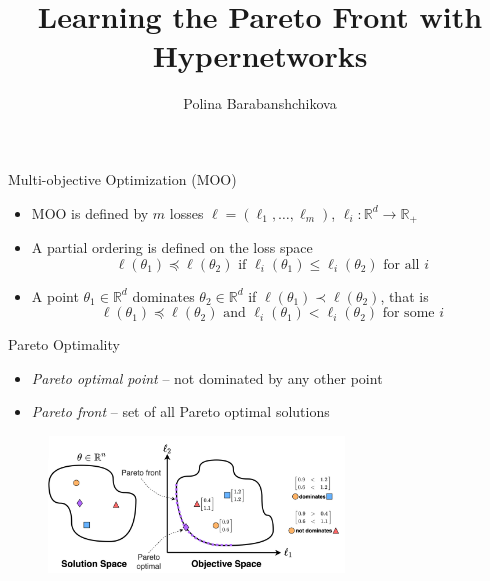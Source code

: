 \documentclass[13pt]{beamer}				\usepackage{graphicx}
\title[Learning the Pareto front with hypernetworks]{Learning the Pareto Front with Hypernetworks}
\author[Polina Barabanshchikova]{Polina Barabanshchikova}
\institute[MIPT]{MIPT}
\begin{document}
\begin{frame}
  \titlepage
\end{frame}

\begin{frame}{Multi-objective Optimization (MOO)}
\begin{itemize}
\item MOO is defined by $m$ losses $\boldsymbol\ell = (\ell_1, \dots, \ell_m)$, $\ell_i : \mathbb{R}^d \rightarrow \mathbb{R}_+$%
\item A partial ordering is defined on the loss space 
$$\boldsymbol\ell (\theta_1) \preceq \boldsymbol\ell (\theta_2) \text{ if } \ell_i(\theta_1) \leq \ell_i(\theta_2) \text{ for all } i$$ 
\item A point $\theta_1 \in \mathbb{R}^d$ dominates $\theta_2 \in \mathbb{R}^d$ if $\boldsymbol\ell (\theta_1) \prec \boldsymbol\ell (\theta_2)$, that is
$$\boldsymbol\ell (\theta_1) \preceq \boldsymbol\ell (\theta_2) \text{ and } \ell_i(\theta_1) < \ell_i(\theta_2) \text{ for some } i$$ 
\end{itemize}
\end{frame}

\begin{frame}{Pareto Optimality}
\begin{itemize}
\item \textit{Pareto optimal point} -- not dominated by any other point
\item \textit{Pareto front} -- set of all Pareto optimal solutions
\end{itemize}
\begin{figure}[h!]
    \includegraphics[width=0.7\textwidth, trim={0 0 0 0cm},clip]{images/pareto_front.png}
\end{figure}
\end{frame}
\end{document}
